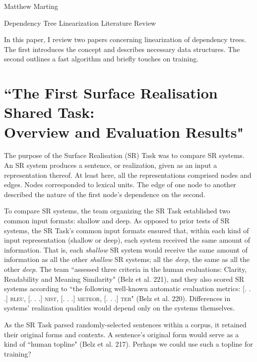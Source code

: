 \documentclass[12pt,letterpaper]{article}
\def \mylastname {Marting}
\def \myname {Matthew \mylastname{}}
\begin{document}
\begin{flushleft}
  \myname{}\\
  {\centering{}Dependency Tree Linearization Literature Review\par{}}
  \setlength{\parindent}{0.5in}
  In this paper, I review two papers concerning linearization of dependency trees. The first introduces the concept and describes necessary data structures. The second outlines a fast algorithm and briefly touches on training.
  \section*{``The First Surface Realisation Shared Task:\\
  Overview and Evaluation Results"}
  The purpose of the Surface Realisation (SR) Task was to compare SR systems. An SR system produces a sentence, or realization, given as an input a representation thereof. At least here, all the representations comprised nodes and edges. Nodes corresponded to lexical units. The edge of one node to another described the nature of the first node's dependence on the second.

  To compare SR systems, the team organizing the SR Task established two common input formats: shallow and deep. As opposed to prior tests of SR systems, the SR Task's common input formats ensured that, within each kind of input representation (shallow or deep), each system received the same amount of information. That is, each \textit{shallow} SR system would receive the same amount of information as all the other \textit{shallow} SR systems; all the \textit{deep}, the same as all the other \textit{deep}. The team ``assessed three criteria in the human evaluations: Clarity, Readability and Meaning Similarity" (Belz et al. 221), and they also scored SR systems according to ``the following well-known automatic evaluation metrics: [. . .] \textsc{bleu}, [. . .] \textsc{nist}, [. . .] \textsc{meteor}, [. . .] \textsc{ter}" (Belz et al. 220). Differences in systems' realization qualities would depend only on the systems themselves.

  As the SR Task parsed randomly-selected sentences within a corpus, it retained their original forms and contexts. A sentence's original form would serve as a kind of ``human topline" (Belz et al. 217). Perhaps we could use such a topline for training?


\end{flushleft}
\end{document}

